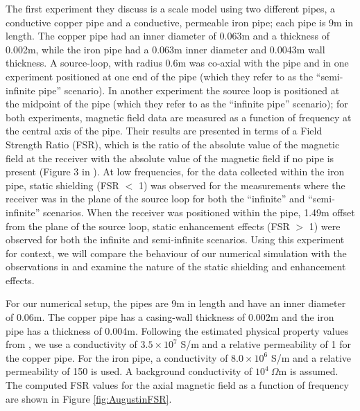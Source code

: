 The first experiment they discuss is a scale model using two different pipes, a conductive copper pipe and a conductive, permeable iron pipe; each pipe is 9m in length. The copper pipe had an inner diameter of 0.063m and a thickness of 0.002m, while the iron pipe had a 0.063m inner diameter and 0.0043m wall thickness. A source-loop, with radius 0.6m was co-axial with the pipe and in one experiment positioned at one end of the pipe (which they refer to as the ``semi-infinite pipe'' scenario). In another experiment the source loop is positioned at the midpoint of the pipe (which they refer to as the ``infinite pipe'' scenario); for both experiments, magnetic field data are measured as a function of frequency at the central axis of the pipe. Their results are presented in terms of a Field Strength Ratio (FSR), which is the ratio of the absolute value of the magnetic field at the receiver with the absolute value of the magnetic field if no pipe is present (Figure 3 in \cite{Augustin1989}). At low frequencies, for the data collected within the iron pipe, static shielding (FSR $<$ 1) was observed for the measurements where the receiver was in the plane of the source loop for both the ``infinite'' and ``semi-infinite'' scenarios. When the receiver was positioned within the pipe, 1.49m offset from the plane of the source loop, static enhancement effects (FSR $>$ 1) were observed for both the infinite and semi-infinite scenarios. Using this experiment for context, we will compare the behaviour of our numerical simulation with the observations in \citep{Augustin1989} and examine the nature of the static shielding and enhancement effects.

For our numerical setup, the pipes are 9m in length and have an inner diameter of 0.06m. The copper pipe has a casing-wall thickness of 0.002m and the iron pipe has a thickness of 0.004m. Following the estimated physical property values from \cite{Augustin1989}, we use a conductivity of $3.5 \times 10^7$ S/m and a relative permeability of 1 for the copper pipe. For the iron pipe, a conductivity of $8.0 \times 10^6$ S/m and a relative permeability of 150 is used. A background conductivity of $10^4 ~\Omega$m is assumed. The computed FSR values for the axial magnetic field as a function of frequency are shown in Figure \ref{fig:AugustinFSR}.




